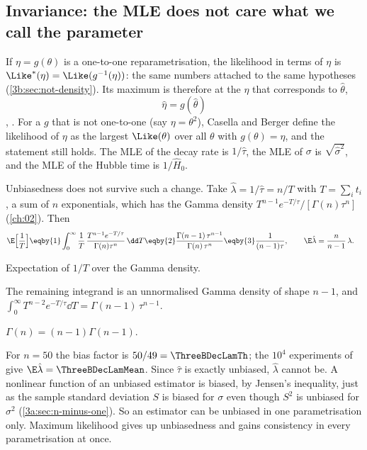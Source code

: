 \subsection{Invariance: the MLE does not care what we call the parameter}
\label{3b:sec:invariance}

If $\eta=g(\theta)$ is a one-to-one reparametrisation, the likelihood in
terms of $\eta$ is $\Like^*(\eta)=\Like(g^{-1}(\eta))$: the same numbers
attached to the same hypotheses (\cref{3b:sec:not-density}). Its maximum is
therefore at the $\eta$ that corresponds to $\hat\theta$,
\[
  \hat\eta=g(\hat\theta)
\]
, . For a $g$
that is not one-to-one (say $\eta=\theta^2$), Casella and Berger define the
likelihood of $\eta$ as the largest $\Like(\theta)$ over all $\theta$ with
$g(\theta)=\eta$, and the statement still holds. The MLE of the decay rate
is $1/\hat\tau$, the MLE of $\sigma$ is $\sqrt{\hat\sigma^2}$, and the MLE
of the Hubble time is $1/\hat H_0$.

Unbiasedness does not survive such a change. Take $\hat\lambda=1/\hat\tau=n/T$
with $T=\sum_it_i$, a sum of $n$ exponentials, which has the Gamma density
$T^{n-1}e^{-T/\tau}/[\Gamma(n)\tau^n]$ (\cref{ch:02}). Then
\begin{align*}
  \E\Bigl[\frac1T\Bigr]
  &\eqby{1}\int_0^\infty\frac1T\,\frac{T^{n-1}e^{-T/\tau}}{\Gamma(n)\tau^n}\,\dd T
  \eqby{2}\frac{\Gamma(n-1)\,\tau^{n-1}}{\Gamma(n)\,\tau^n}
  \eqby{3}\frac{1}{(n-1)\tau},
  \qquad
  \E\hat\lambda=\frac{n}{n-1}\,\lambda .
\end{align*}
\begin{explain}
  \item Expectation of $1/T$ over the Gamma density.
  \item The remaining integrand is an unnormalised Gamma density of shape
        $n-1$, and
        $\int_0^\infty T^{n-2}e^{-T/\tau}\dd T=\Gamma(n-1)\,\tau^{n-1}$.
  \item $\Gamma(n)=(n-1)\Gamma(n-1)$.
\end{explain}
For $n=50$ the bias factor is $50/49=\ThreeBDecLamTh$; the $10^4$
experiments of  give $\E\hat\lambda=\ThreeBDecLamMean$.
Since $\hat\tau$ is exactly unbiased, $\hat\lambda$ cannot be. A nonlinear
function of an unbiased estimator is biased, by Jensen's inequality, just
as the sample standard deviation $S$ is biased for $\sigma$ even though
$S^2$ is unbiased for $\sigma^2$ (\cref{3a:sec:n-minus-one}). So an
estimator can be unbiased in one parametrisation only. Maximum likelihood
gives up unbiasedness and gains consistency in every parametrisation at
once.

